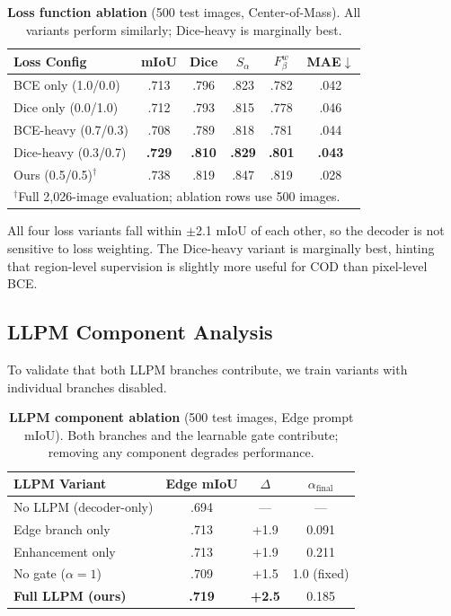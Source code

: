 \begin{table}[t]
\centering
\caption{\textbf{Loss function ablation} (500 test images, Center-of-Mass). All variants perform similarly; Dice-heavy is marginally best.}
\label{tab:ablation_loss}
\small
\begin{tabular}{lccccc}
\toprule
Loss Config & mIoU & Dice & $S_\alpha$ & $F_\beta^w$ & MAE$\downarrow$ \\
\midrule
BCE only (1.0/0.0) & .713 & .796 & .823 & .782 & .042 \\
Dice only (0.0/1.0) & .712 & .793 & .815 & .778 & .046 \\
BCE-heavy (0.7/0.3) & .708 & .789 & .818 & .781 & .044 \\
Dice-heavy (0.3/0.7) & \textbf{.729} & \textbf{.810} & \textbf{.829} & \textbf{.801} & \textbf{.043} \\
\midrule
Ours (0.5/0.5)$^\dagger$ & .738 & .819 & .847 & .819 & .028 \\
\bottomrule
\multicolumn{6}{l}{\footnotesize $^\dagger$Full 2,026-image evaluation; ablation rows use 500 images.}
\end{tabular}
\end{table}

All four loss variants fall within $\pm$2.1 mIoU of each other, so the decoder is not sensitive to loss weighting. The Dice-heavy variant is marginally best, hinting that region-level supervision is slightly more useful for COD than pixel-level BCE.

\subsection{LLPM Component Analysis}

To validate that both LLPM branches contribute, we train variants with individual branches disabled.

\begin{table}[t]
\centering
\caption{\textbf{LLPM component ablation} (500 test images, Edge prompt mIoU). Both branches and the learnable gate contribute; removing any component degrades performance.}
\label{tab:ablation_llpm}
\small
\begin{tabular}{lccc}
\toprule
LLPM Variant & Edge mIoU & $\Delta$ & $\alpha_{\text{final}}$ \\
\midrule
No LLPM (decoder-only) & .694 & --- & --- \\
Edge branch only & .713 & +1.9 & 0.091 \\
Enhancement only & .713 & +1.9 & 0.211 \\
No gate ($\alpha\!=\!1$) & .709 & +1.5 & 1.0 (fixed) \\
\textbf{Full LLPM (ours)} & \textbf{.719} & \textbf{+2.5} & 0.185 \\
\bottomrule
\end{tabular}
\end{table}


